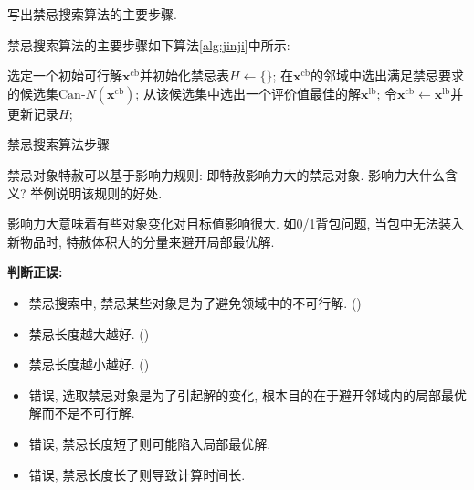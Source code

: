 \documentclass{article}
\begin{document}
\begin{homeworkProblem}
    写出禁忌搜索算法的主要步骤.

    \solution 禁忌搜索算法的主要步骤如下算法\ref{alg:jinji}中所示:
    \begin{algorithm}[H]
		\begin{algorithmic}[1]
        \State 选定一个初始可行解$\boldsymbol{x}^{\text{cb}}$并初始化禁忌表$H\gets \{\}$;
            \State 在$\boldsymbol{x}^{\text{cb}}$的邻域中选出满足禁忌要求的候选集$\text{Can-}N\left( \boldsymbol{x}^{\text{cb}} \right)$;
            \State 从该候选集中选出一个评价值最佳的解$\boldsymbol{x}^{\text{lb}}$;
            \State 令$\boldsymbol{x}^{\text{cb}}\gets \boldsymbol{x}^{\text{lb}}$并更新记录$H$;
        \EndWhile
		\end{algorithmic}
		\caption{禁忌搜索算法步骤}
		\label{alg:jinji}
	\end{algorithm}
\end{homeworkProblem}

\begin{homeworkProblem}
    禁忌对象特赦可以基于影响力规则: 即特赦影响力大的禁忌对象. 影响力大什么含义? 举例说明该规则的好处.

    \solution 影响力大意味着有些对象变化对目标值影响很大. 如0/1背包问题, 当包中无法装入新物品时, 特赦体积大的分量来避开局部最优解.
\end{homeworkProblem}

\pagebreak


\begin{homeworkProblem}
    \textbf{判断正误:}
    \begin{itemize}
        \item 禁忌搜索中, 禁忌某些对象是为了避免领域中的不可行解. (\quad )
        \item 禁忌长度越大越好. (\quad )
        \item 禁忌长度越小越好. (\quad )
    \end{itemize}
    \solution 
    \begin{itemize}
        \item 错误, 选取禁忌对象是为了引起解的变化, 根本目的在于避开邻域内的局部最优解而不是不可行解.
        \item 错误, 禁忌长度短了则可能陷入局部最优解.
        \item 错误, 禁忌长度长了则导致计算时间长.
    \end{itemize}
\end{homeworkProblem}
\end{document}
